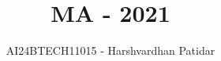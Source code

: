 \documentclass[journal]{IEEEtran}
\begin{document}

\vspace{3cm}

\title{MA - 2021}
\author{AI24BTECH11015 - Harshvardhan Patidar}
 \maketitle
{\let\newpage\relax\maketitle}

\renewcommand{\thefigure}{\theenumi}
\renewcommand{\thetable}{\theenumi}
\setlength{\intextsep}{10pt} %


\renewcommand{\thetable}{\theenumi}
\end{document}
